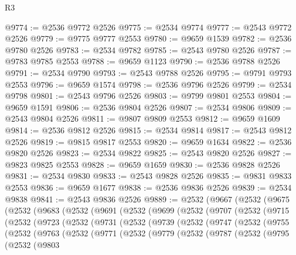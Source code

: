 \begin{lexlean}{R3}
\begin{coremodule}
@9774 := @2536 @9772 @2526
@9775 := @2534 @9774
@9777 := @2543 @9772 @2526
@9779 := @9775 @9777 @2553
@9780 := @9659 @1539
@9782 := @2536 @9780 @2526
@9783 := @2534 @9782
@9785 := @2543 @9780 @2526
@9787 := @9783 @9785 @2553
@9788 := @9659 @1123
@9790 := @2536 @9788 @2526
@9791 := @2534 @9790
@9793 := @2543 @9788 @2526
@9795 := @9791 @9793 @2553
@9796 := @9659 @1574
@9798 := @2536 @9796 @2526
@9799 := @2534 @9798
@9801 := @2543 @9796 @2526
@9803 := @9799 @9801 @2553
@9804 := @9659 @1591
@9806 := @2536 @9804 @2526
@9807 := @2534 @9806
@9809 := @2543 @9804 @2526
@9811 := @9807 @9809 @2553
@9812 := @9659 @1609
@9814 := @2536 @9812 @2526
@9815 := @2534 @9814
@9817 := @2543 @9812 @2526
@9819 := @9815 @9817 @2553
@9820 := @9659 @1634
@9822 := @2536 @9820 @2526
@9823 := @2534 @9822
@9825 := @2543 @9820 @2526
@9827 := @9823 @9825 @2553
@9828 := @9659 @1659
@9830 := @2536 @9828 @2526
@9831 := @2534 @9830
@9833 := @2543 @9828 @2526
@9835 := @9831 @9833 @2553
@9836 := @9659 @1677
@9838 := @2536 @9836 @2526
@9839 := @2534 @9838
@9841 := @2543 @9836 @2526
@9889 := @2532
    (@9667
      (@2532
        (@9675
          (@2532
            (@9683
              (@2532
                (@9691
                  (@2532
                    (@9699
                      (@2532
                        (@9707
                          (@2532
                            (@9715
                              (@2532
                                (@9723
                                  (@2532
                                    (@9731
                                      (@2532
                                        (@9739
                                          (@2532
                                            (@9747
                                              (@2532
                                                (@9755
                                                  (@2532
                                                    (@9763
                                                      (@2532
                                                        (@9771
                                                          (@2532
                                                            (@9779
                                                              (@2532
                                                                (@9787
                                                                  (@2532
                                                                    (@9795
                                                                      (@2532
                                                                        (@9803

\end{coremodule}
\end{lexlean}
